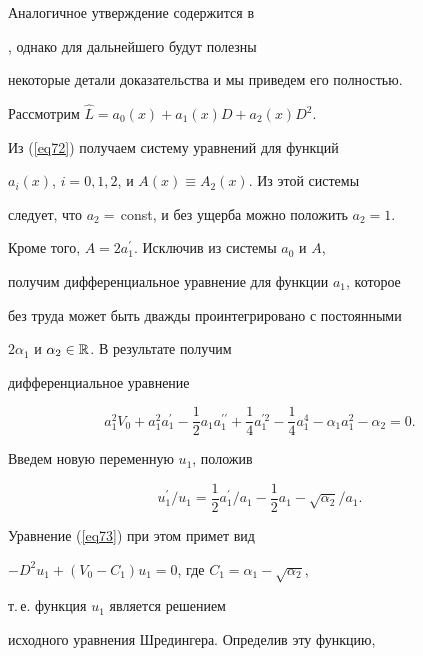 \begin{pf}


Аналогичное утверждение содержится в


\cite{xxx}, однако для дальнейшего будут полезны


некоторые детали доказательства и мы приведем его полностью.





Рассмотрим $\widehat{L}=a_0(x)+a_1(x)D+a_2(x)D^2$.


Из (\ref{eq72}) получаем систему уравнений для функций


$a_i(x)$, $i=0,1,2$, и $A(x)\equiv A_2(x)$. Из этой системы


следует, что $a_2=$\,const, и без ущерба можно положить $a_2=1$.


Кроме того, $A=2a_1^{\prime }$. Исключив из системы $a_0$ и $A$,


получим дифференциальное уравнение для функции $a_1$, которое


без  труда может быть дважды проинтегрировано с постоянными


$2\alpha _1$ и $\alpha _2\in {\Bbb R} $. В результате получим


дифференциальное уравнение


\begin{equation}


a_1^2V_0+a_1^2a_1^{\prime }-\frac 12a_1a_1^{\prime \prime }


+\frac 14a_1^{\prime 2}-\frac 14a_1^4-\alpha _1a_1^2-\alpha_2=0.


\label{eq73}


\end{equation}


Введем новую переменную $u_1$, положив


\begin{equation}


u_1^{\prime }/u_1=\frac 12a_1^{\prime }/a_1-\frac 12a_1-


\sqrt{\alpha _2}/a_1.


\label{eq74}


\end{equation}


Уравнение (\ref{eq73}) при этом примет вид


$-D^2u_1+(V_0-C_1)u_1=0$, где $C_1=\alpha_1-\sqrt{\alpha _2}$,


т.\,е. функция $u_1$ является решением


исходного уравнения Шредингера. Определив эту функцию,



\end{pf}
